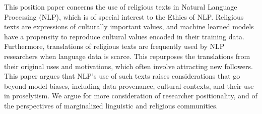 This position paper concerns the use of religious texts in Natural Language Processing (NLP), which is of special interest to the Ethics of NLP. Religious texts are expressions of culturally important values, and machine learned models have a  propensity to reproduce cultural values encoded in their training data. Furthermore, translations of religious texts are frequently used by NLP researchers when language data is scarce. This repurposes the translations from their original uses and motivations, which often involve attracting new followers. This paper argues that NLP's use of such texts raises considerations that go beyond model biases, including data provenance, cultural contexts, and their use in proselytism. We argue for more consideration of researcher positionality, and of the perspectives of marginalized linguistic and religious communities.